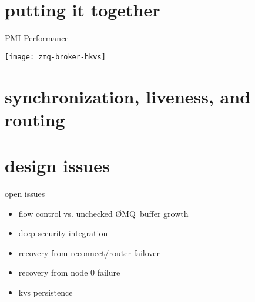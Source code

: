 \documentclass[default,pdf,colorBG,slideColor]{prosper}
\newcommand{\zMQ}{\O{}MQ}
\begin{document}
\part{putting it together}

\begin{slide}{PMI Performance}{\small
\begin{center}
  \texttt{[image: zmq-broker-hkvs]}
\end{center}
}\end{slide}

\part{synchronization, liveness, and routing}

\part{design issues}

\begin{slide}{open issues}{\small
\begin{itemize}
  \item{flow control vs. unchecked \zMQ\ buffer growth}
  \item{deep security integration}
  \item{recovery from reconnect/router failover}
  \item{recovery from node 0 failure}
  \item{kvs persistence}
\end{itemize}
}\end{slide}
\end{document}
